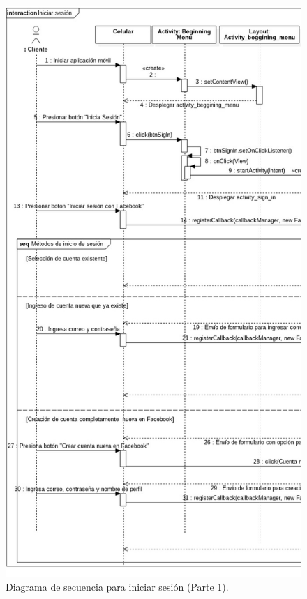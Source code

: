 \FloatBarrier
\begin{figure}[htbp!]
		\centering
			\includegraphics[width=.68 \textwidth]{imagenes/Diagramas_UserApp/Nuevos_diagramas/IniciarSesion_1}
		\caption{Diagrama de secuencia para iniciar sesión (Parte 1).}
		\label{image:DSIniciarsesion1}
\end{figure}
\FloatBarrier

